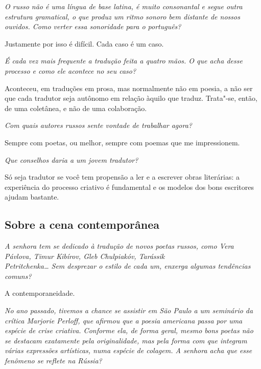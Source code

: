 \medskip

\emph{O russo não é uma língua de base latina, é muito consonantal e
segue outra estrutura gramatical, o que produz um ritmo sonoro bem
distante de nossos ouvidos. Como verter essa sonoridade para o
português?}

Justamente por isso é difícil. Cada caso é um caso.

\medskip

\emph{É cada vez mais frequente a tradução feita a quatro mãos. O que
acha desse processo e como ele acontece no seu caso?}

Aconteceu, em traduções em prosa, mas normalmente não em poesia, a não ser que cada
tradutor seja autônomo em relação àquilo que traduz. Trata"-se, então, de
uma coletânea, e não de uma colaboração.

\medskip

\emph{Com quais autores russos sente vontade de trabalhar agora?}

Sempre com poetas, ou melhor, sempre com poemas que me impressionem.

\medskip

\emph{Que conselhos daria a um jovem tradutor?}

Só seja tradutor se você tem propensão a ler e a escrever obras
literárias: a experiência do processo criativo é fundamental e os
modelos dos bons escritores ajudam bastante.

\subsection{\uppercase{S}obre a cena contemporânea}

\emph{A senhora tem se dedicado à tradução de novos poetas russos, como
Vera Pávlova, Timur Kibírov, Gleb Chulpiakóv, Tarássik}\\

\noindent{}\emph{Petritchenka\ldots{}
Sem desprezar o estilo de cada um, enxerga algumas tendências comuns?}

A contemporaneidade.

\medskip

\emph{No ano passado, tivemos a chance se assistir em São Paulo a um
seminário da crítica Marjorie Perloff, que afirmou que a poesia
americana passa por uma espécie de crise criativa. Conforme ela, de
forma geral, mesmo bons poetas não se destacam exatamente pela
originalidade, mas pela forma com que integram várias expressões
artísticas, numa espécie de colagem. A senhora acha que esse fenômeno se
reflete na Rússia?}

